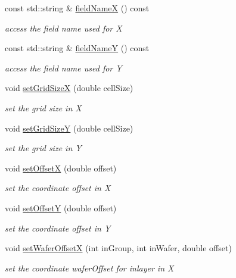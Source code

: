 \begin{DoxyCompactItemize}
const std\+::string \& \hyperlink{class_d_d4hep_1_1_d_d_segmentation_1_1_wafer_grid_x_y_a4e211babbc74601240aba4ce6c683d2b}{field\+NameX} () const
\begin{DoxyCompactList}\small\item\em access the field name used for X \end{DoxyCompactList}\item 
const std\+::string \& \hyperlink{class_d_d4hep_1_1_d_d_segmentation_1_1_wafer_grid_x_y_a0d02a44320f03ddf68eae9e3bb84e4a6}{field\+NameY} () const
\begin{DoxyCompactList}\small\item\em access the field name used for Y \end{DoxyCompactList}\item 
void \hyperlink{class_d_d4hep_1_1_d_d_segmentation_1_1_wafer_grid_x_y_a890894a5afd02db5c888fba69c5489d7}{set\+Grid\+SizeX} (double cell\+Size)
\begin{DoxyCompactList}\small\item\em set the grid size in X \end{DoxyCompactList}\item 
void \hyperlink{class_d_d4hep_1_1_d_d_segmentation_1_1_wafer_grid_x_y_a8330f514334f70de9b381170c3bcf8ef}{set\+Grid\+SizeY} (double cell\+Size)
\begin{DoxyCompactList}\small\item\em set the grid size in Y \end{DoxyCompactList}\item 
void \hyperlink{class_d_d4hep_1_1_d_d_segmentation_1_1_wafer_grid_x_y_a7721c7a200c1893f1badcbc78e1319d8}{set\+OffsetX} (double offset)
\begin{DoxyCompactList}\small\item\em set the coordinate offset in X \end{DoxyCompactList}\item 
void \hyperlink{class_d_d4hep_1_1_d_d_segmentation_1_1_wafer_grid_x_y_a0db51fa22c800ca21f6c6c18b0740012}{set\+OffsetY} (double offset)
\begin{DoxyCompactList}\small\item\em set the coordinate offset in Y \end{DoxyCompactList}\item 
void \hyperlink{class_d_d4hep_1_1_d_d_segmentation_1_1_wafer_grid_x_y_a95441c0bdca2bd9d72f5711a98bbec83}{set\+Wafer\+OffsetX} (int in\+Group, int in\+Wafer, double offset)
\begin{DoxyCompactList}\small\item\em set the coordinate wafer\+Offset for inlayer in X \end{DoxyCompactList}\item 

\end{DoxyCompactItemize}
